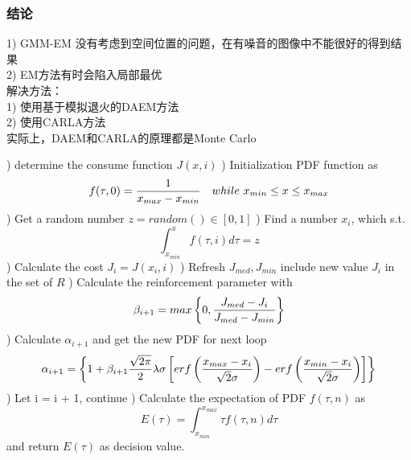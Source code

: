 \documentclass[notheorems, UTF8]{ctexbeamer}
\begin{document}
\begin{frame}
\frametitle{结论}
1) GMM-EM 没有考虑到空间位置的问题，在有噪音的图像中不能很好的得到结果\\
2) EM方法有时会陷入局部最优\\

解决方法：\\
1) 使用基于模拟退火的DAEM方法\\
2) 使用CARLA方法\\
实际上，DAEM和CARLA的原理都是Monte Carlo
\end{frame}



\begin{frame}

\begin{algorithm}[H]
\tiny
\begin{algorithmic}
) determine the consume function $J(x, i)$
) Initialization PDF function as 
\begin{displaymath}
f(\tau, 0) = {1 \over x_{max} - x_{min}}\ \ \ while\  x_{min} \leq x \leq x_{max}
\end{displaymath}
) Get a random number $z = random() \in [0, 1]$
) Find a number $x_i$, which s.t.
\begin{displaymath}
\int_{x_{min}}^{x} f(\tau, i) d\tau = z
\end{displaymath}
) Calculate the cost $J_i = J(x_i, i)$
) Refresh $J_{med}, J_{min}$ include new value $J_i$ in the set of $R$
) Calculate the reinforcement parameter with
\begin{displaymath}
\beta_{i+1} = max\left\{0, {J_{med} - J_i \over J_{med} - J_{min}}\right\}
\end{displaymath}
) Calculate $\alpha_{i+1}$ and get the new PDF for next loop
\begin{displaymath}
\alpha_{i+1} = \left\{1 + \beta_{i+1} {\sqrt{2\pi} \over 2} \lambda \sigma \left[erf\left({x_{max} - x_i \over \sqrt{2} \sigma} \right) - erf\left({x_{min} - x_i \over \sqrt{2} \sigma} \right)\right]\right\}
\end{displaymath}
) Let i = i + 1, continue
\EndWhile
{}) Calculate the expectation of PDF $f(\tau, n)$ as 
\begin{displaymath}
E(\tau) = \int_{x_{min}}^{x_{max}} \tau f(\tau, n) d\tau
\end{displaymath}
and return $E(\tau)$ as decision value.
\end{algorithmic}
\end{algorithm}
\end{frame}
\end{document}
